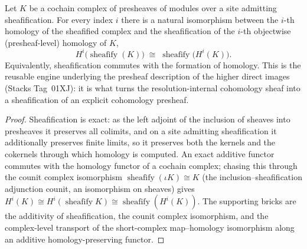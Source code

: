 \begin{lemma}
  \label{mk-lem:cohomology_sheaf_is_sheafify_homology}

  Let \(K\) be a cochain complex of presheaves of modules over a site admitting
  sheafification. For every index \(i\) there is a natural
  isomorphism between the \(i\)-th homology of the sheafified complex and the
  sheafification of the \(i\)-th objectwise (presheaf-level) homology of \(K\),
  \[
    H^i\bigl(\operatorname{sheafify}(K)\bigr)
      \;\cong\;
    \operatorname{sheafify}\bigl(H^i(K)\bigr).
  \]
  Equivalently, sheafification commutes with the formation of homology. This is the
  reusable engine underlying the presheaf description of the higher direct images
  (Stacks Tag~01XJ): it is what turns the resolution-internal cohomology sheaf into a
  sheafification of an explicit cohomology presheaf.
\end{lemma}

\begin{proof}
  Sheafification is exact: as the left adjoint of the inclusion of sheaves into
  presheaves it preserves all colimits, and on a site admitting sheafification it
  additionally preserves finite limits, so it preserves both the kernels and the
  cokernels through which homology is computed. An exact additive functor commutes with
  the homology functor of a cochain complex; chasing this through the counit complex
  isomorphism \(\operatorname{sheafify}(\iota K) \cong K\) (the inclusion–sheafification
  adjunction counit, an isomorphism on sheaves) gives
  \(H^i(K) \cong H^i(\operatorname{sheafify} K) \cong
  \operatorname{sheafify}(H^i(K))\). The supporting bricks are the
  additivity of sheafification, the counit complex isomorphism, and the
  complex-level transport of the short-complex map–homology isomorphism along an
  additive homology-preserving functor.
\end{proof}

